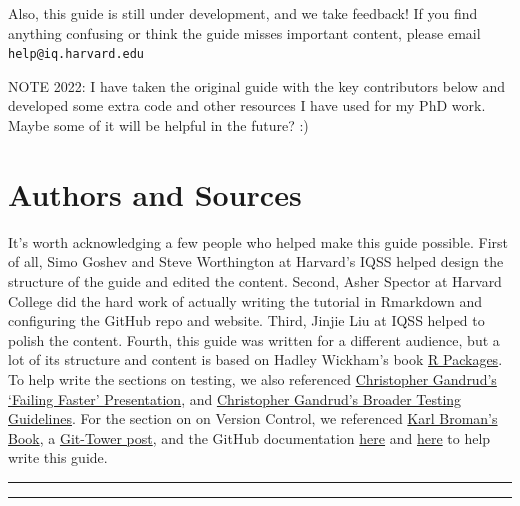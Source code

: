 \documentclass[
]{book}
\begin{document}
Also, this guide is still under development, and we take feedback! If you find anything confusing or think the guide misses important content, please email \texttt{help@iq.harvard.edu}

NOTE 2022: I have taken the original guide with the key contributors below and developed some extra code and other resources I have used for my PhD work. Maybe some of it will be helpful in the future? :)

\hypertarget{authors-and-sources}{%
\section*{Authors and Sources}\label{authors-and-sources}}

It's worth acknowledging a few people who helped make this guide possible. First of all, Simo Goshev and Steve Worthington at Harvard's IQSS helped design the structure of the guide and edited the content. Second, Asher Spector at Harvard College did the hard work of actually writing the tutorial in Rmarkdown and configuring the GitHub repo and website. Third, Jinjie Liu at IQSS helped to polish the content. Fourth, this guide was written for a different audience, but a lot of its structure and content is based on Hadley Wickham's book \href{http://r-pkgs.had.co.nz/}{R Packages}. To help write the sections on testing, we also referenced \href{http://slides.com/christophergandrud/failing-faster\#/24}{Christopher Gandrud's `Failing Faster' Presentation}, and \href{https://github.com/IQSS/social_science_software_toolkit/blob/master/testing/recommended_testing_tools_R.md\#recommended-testing-tools-and-process-for-r-packages}{Christopher Gandrud's Broader Testing Guidelines}. For the section on on Version Control, we referenced \href{https://kbroman.org/github_tutorial/}{Karl Broman's Book}, a \href{https://www.git-tower.com/learn/git/faq/restore-repo-to-previous-revision}{Git-Tower post}, and the GitHub documentation \href{https://git-scm.com/book/en/v2/Getting-Started-Git-Basics}{here} and \href{https://git-scm.com/book/en/v2/Getting-Started-First-Time-Git-Setup}{here} to help write this guide.

\begin{center}\rule{0.5\linewidth}{0.5pt}\end{center}

\begin{center}\rule{0.5\linewidth}{0.5pt}\end{center}
\end{document}
